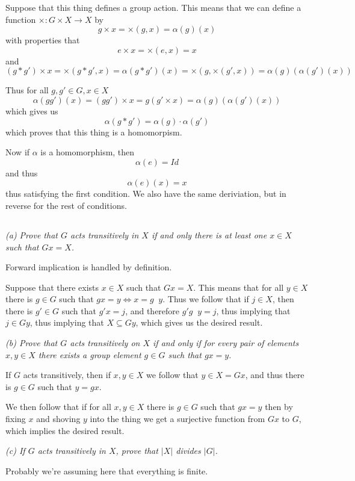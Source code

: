 \documentclass[11pt,oneside,titlepage]{book}
\DeclareMathOperator \inv {^{-1}}
\DeclareMathOperator \lra {\Leftrightarrow}
\begin{document}
Suppose that this thing defines a group action. This means that
we can define a function $\times: G \times X \to X$ by
$$g \times x = \times(g, x) = \alpha(g)(x)$$
with properties that
$$e \times x = \times (e, x) = x$$
and
$$(g * g')  \times x = \times(g * g', x) = \alpha (g * g')(x)
= \times(g, \times (g', x)) = \alpha(g)(\alpha(g')(x))$$

Thus for all $g, g' \in G, x \in X$
$$ \alpha(g  g')(x) = (g g') \times x =
g (g' \times x) = \alpha(g)( \alpha(g')(x))$$
which gives us
$$\alpha(g * g') = \alpha(g) \cdot \alpha(g')$$
which proves that this thing is a homomorpism.

Now if $\alpha$ is a homomorphism, then
$$\alpha(e) = Id$$
and thus
$$\alpha(e)(x) = x$$
thus satisfying the first condition. We also have the same
deriviation, but in reverse for the rest of conditions.

\subsection{}

\textit{(a) Prove that $G$ acts transitively in $X$ if and only there
  is at least one $x \in X$ such that $Gx = X$.}

Forward implication is handled by definition.

Suppose that there exists $x \in X$ such that $Gx = X$. This means
that for all $y \in X$ there is $g \in G$ such that $gx = y \lra x = g\inv y$.
Thus we follow that if $j \in X$, then there is $g' \in G$ such that
$g'x = j$, and therefore $g' g\inv y = j$, thus implying that $j \in
Gy$, thus implying that $X \subseteq Gy$, which gives us the desired result.

\textit{(b) Prove that $G$ acts transitively on $X$ if and only if for
  every pair of elements $x, y \in X$ there exists a group element $g \in G$
  such that $gx = y$.}

If $G$ acts transitively, then if $x, y \in X$ we follow that $y \in X = Gx$,
and thus there is $g \in G$ such that $y = gx$.

We then follow that if for all $x, y \in X$ there is $g \in G$ such that
$gx = y$ then by fixing $x$ and shoving $y$ into the thing we get a
surjective function from $Gx$ to $G$, which implies the desired result.

\textit{(c) If $G$ acts transitively in $X$, prove that $|X|$ divides
  $|G|$.}

Probably we're assuming here that everything is finite.
\end{document}

